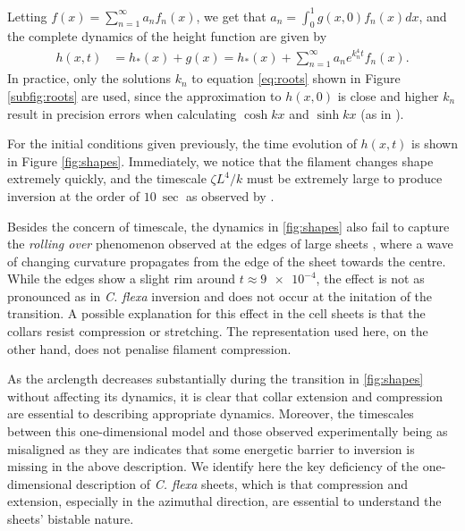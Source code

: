 Letting $f(x) = \sum_{n=1}^\infty a_n f_n(x)$, we get that $a_n = \int_0^1 g(x, 0) f_n(x)dx$, and the complete dynamics of the height function are given by 
\begin{align}
    h(x, t) &= h_*(x) + g(x) = h_*(x) + \sum_{n=1}^\infty a_n e^{k_n^4 t} f_n(x). \label{eq:sol}
\end{align}
\noindent In practice, only the solutions $k_n$ to equation \ref{eq:roots} shown in Figure \ref{subfig:roots} are used, since the approximation to $h(x, 0)$ is close and higher $k_n$ result in precision errors when calculating $\cosh kx$ and $\sinh kx$ (as in \citet{wiggins1998}). 

For the initial conditions given previously, the time evolution of $h(x, t)$ is shown in Figure \ref{fig:shapes}. 
Immediately, we notice that the filament changes shape extremely quickly, and the timescale $\zeta L^4 / k$ must be extremely large to produce inversion at the order of $\SI{10}{\sec}$ as observed by \citet{brunet2019}. 

Besides the concern of timescale, the dynamics in \cref{fig:shapes} also fail to capture the \textit{rolling over} phenomenon observed at the edges of large sheets \citep{brunet2019}, where a wave of changing curvature propagates from the edge of the sheet towards the centre. 
While the edges show a slight rim around $t\approx\num{9e-4}$, the effect is not as pronounced as in \textit{C. flexa} inversion and does not occur at the initation of the transition.  
A possible explanation for this effect in the cell sheets is that the collars resist compression or stretching. 
The representation used here, on the other hand, does not penalise filament compression.

As the arclength decreases substantially during the transition in \cref{fig:shapes} without affecting its dynamics, it is clear that collar extension and compression are essential to describing appropriate dynamics. Moreover, the timescales between this one-dimensional model and those observed experimentally being as misaligned as they are indicates that some energetic barrier to inversion is missing in the above description. 
We identify here the key deficiency of the one-dimensional description of \textit{C. flexa} sheets, which is that compression and extension, especially in the azimuthal direction, are essential to understand the sheets' bistable nature.

